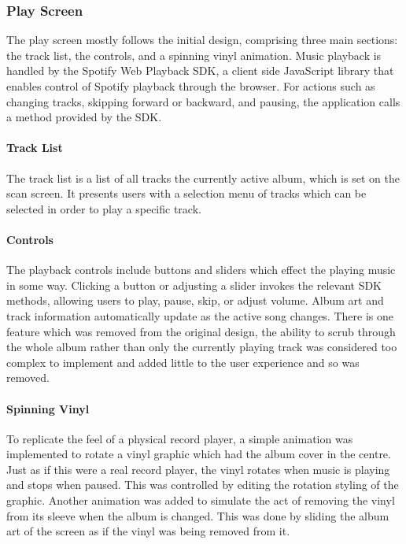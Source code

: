 \subsubsection{Play Screen}
The play screen mostly follows the initial design, comprising three main sections: the track list, the controls, and a spinning vinyl animation. Music playback is handled by the Spotify Web Playback SDK, a client side JavaScript library that enables control of Spotify playback through the browser. For actions such as changing tracks, skipping forward or backward, and pausing, the application calls a method provided by the SDK.

\paragraph{Track List} The track list is a list of all tracks the currently active album, which is set on the scan screen. It presents users with a selection menu of tracks which can be selected in order to play a specific track.

\paragraph{Controls} The playback controls include buttons and sliders which effect the playing music in some way. Clicking a button or adjusting a slider invokes the relevant SDK methods, allowing users to play, pause, skip, or adjust volume. Album art and track information automatically update as the active song changes. There is one feature which was removed from the original design, the ability to scrub through the whole album rather than only the currently playing track was considered too complex to implement and added little to the user experience and so was removed.

\paragraph{Spinning Vinyl} To replicate the feel of a physical record player, a simple animation was implemented to rotate a vinyl graphic which had the album cover in the centre. Just as if this were a real record player, the vinyl rotates when music is playing and stops when paused. This was controlled by editing the rotation styling of the graphic. Another animation was added to simulate the act of removing the vinyl from its sleeve when the album is changed. This was done by sliding the album art of the screen as if the vinyl was being removed from it.

